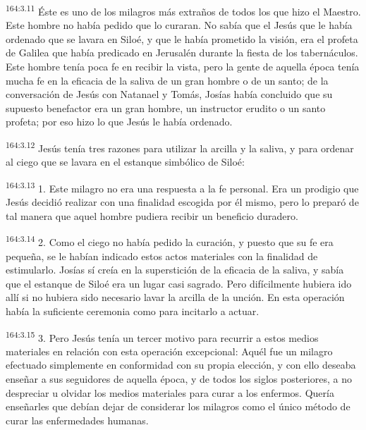 \par 
\textsuperscript{164:3.11} Éste es uno de los milagros más extraños de todos los que hizo el Maestro. Este hombre no había pedido que lo curaran. No sabía que el Jesús que le había ordenado que se lavara en Siloé, y que le había prometido la visión, era el profeta de Galilea que había predicado en Jerusalén durante la fiesta de los tabernáculos. Este hombre tenía poca fe en recibir la vista, pero la gente de aquella época tenía mucha fe en la eficacia de la saliva de un gran hombre o de un santo; de la conversación de Jesús con Natanael y Tomás, Josías había concluido que su supuesto benefactor era un gran hombre, un instructor erudito o un santo profeta; por eso hizo lo que Jesús le había ordenado.

\par 
\textsuperscript{164:3.12} Jesús tenía tres razones para utilizar la arcilla y la saliva, y para ordenar al ciego que se lavara en el estanque simbólico de Siloé:

\par 
\textsuperscript{164:3.13} 1. Este milagro no era una respuesta a la fe personal. Era un prodigio que Jesús decidió realizar con una finalidad escogida por él mismo, pero lo preparó de tal manera que aquel hombre pudiera recibir un beneficio duradero.

\par 
\textsuperscript{164:3.14} 2. Como el ciego no había pedido la curación, y puesto que su fe era pequeña, se le habían indicado estos actos materiales con la finalidad de estimularlo. Josías sí creía en la superstición de la eficacia de la saliva, y sabía que el estanque de Siloé era un lugar casi sagrado. Pero difícilmente hubiera ido allí si no hubiera sido necesario lavar la arcilla de la unción. En esta operación había la suficiente ceremonia como para incitarlo a actuar.

\par 
\textsuperscript{164:3.15} 3. Pero Jesús tenía un tercer motivo para recurrir a estos medios materiales en relación con esta operación excepcional: Aquél fue un milagro efectuado simplemente en conformidad con su propia elección, y con ello deseaba enseñar a sus seguidores de aquella época, y de todos los siglos posteriores, a no despreciar u olvidar los medios materiales para curar a los enfermos. Quería enseñarles que debían dejar de considerar los milagros como el único método de curar las enfermedades humanas.

